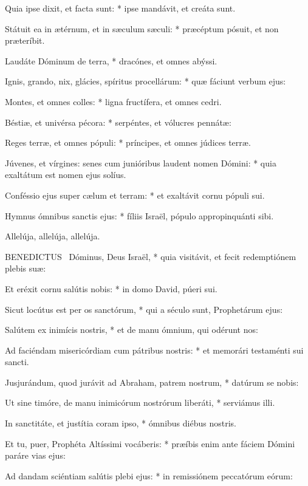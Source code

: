 Quia ipse dixit, et facta sunt: * ipse mandávit, et creáta sunt.

Státuit ea in ætérnum, et in sæculum sæculi: * præcéptum pósuit, et non præteríbit.

Laudáte Dóminum de terra, * dracónes, et omnes abýssi.

Ignis, grando, nix, glácies, spíritus procellárum: * quæ fáciunt verbum ejus:

Montes, et omnes colles: * ligna fructífera, et omnes cedri.

Béstiæ, et univérsa pécora: * serpéntes, et vólucres pennátæ:

Reges terræ, et omnes pópuli: * príncipes, et omnes júdices terræ.

Júvenes, et vírgines: senes cum junióribus laudent nomen Dómini: * quia exaltátum est nomen ejus solíus.

Conféssio ejus super cælum et terram: * et exaltávit cornu pópuli sui.

Hymnus ómnibus sanctis ejus: * fíliis Israël, pópulo appropinquánti sibi.

 Allelúja, allelúja, allelúja.



\lettrine[lines=2]{B}{ENEDICTUS} \textdagger\ Dóminus, Deus Israël, * quia visitávit, et fecit redemptiónem plebis suæ:

Et eréxit cornu salútis nobis: * in domo David, púeri sui.

Sicut locútus est per os sanctórum, * qui a século sunt, Prophetárum ejus:

Salútem ex inimícis nostris, * et de manu ómnium, qui odérunt nos:

Ad faciéndam misericórdiam cum pátribus nostris: * et memorári testaménti sui sancti.

Jusjurándum, quod jurávit ad Abraham, patrem nostrum, * datúrum se nobis:

Ut sine timóre, de manu inimicórum nostrórum liberáti, * serviámus illi.

In sanctitáte, et justítia coram ipso, * ómnibus diébus nostris.

Et tu, puer, Prophéta Altíssimi vocáberis: * præíbis enim ante fáciem Dómini paráre vias ejus:

Ad dandam sciéntiam salútis plebi ejus: * in remissiónem peccatórum eórum:

